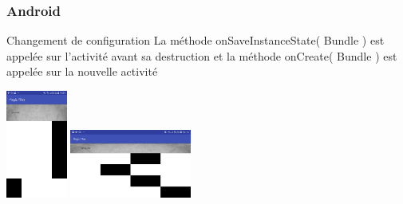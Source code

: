 \documentclass{beamer}
\begin{document}
\begin{frame}
\frametitle{Android}
\begin{block}{Changement de configuration}
	La méthode {\color {blue}onSaveInstanceState}( {\color {green} Bundle} ) est appelée sur l’activité
avant sa destruction et la méthode {\color {blue}onCreate}( {\color {green}Bundle} ) est appelée sur la nouvelle activité


\end{block}

    \begin{center}
      \includegraphics[width=20mm]{AndroidChangeConf1}
      \includegraphics[width=40mm]{AndroidChangeConf}

    \end{center}
   
\end{frame}

\end{document}
